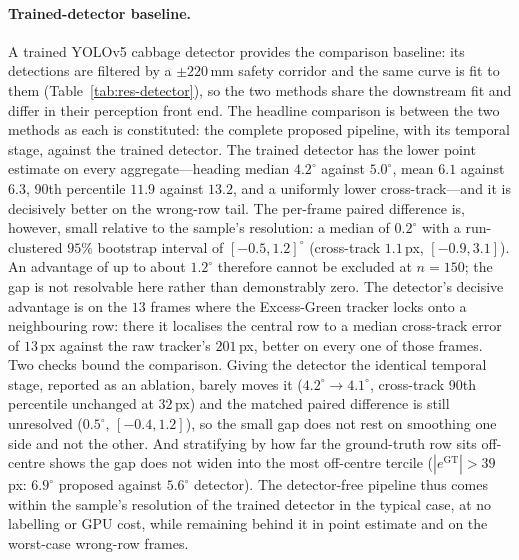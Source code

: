 \paragraph{Trained-detector baseline.}
A trained YOLOv5 cabbage detector provides the comparison baseline: its detections are filtered by a
$\pm220$\,mm safety corridor and the same curve is fit to them (Table~\ref{tab:res-detector}), so the two
methods share the downstream fit and differ in their perception front end. The headline comparison is between
the two methods as each is constituted: the complete proposed pipeline, with its temporal stage, against the
trained detector. The trained detector has the lower point estimate on every aggregate---heading median $4.2^\circ$ against
$5.0^\circ$, mean $6.1$ against $6.3$, 90th percentile $11.9$ against $13.2$, and a uniformly lower
cross-track---and it is decisively better on the wrong-row tail. The per-frame paired difference is, however,
small relative to the sample's resolution: a median of $0.2^\circ$ with a run-clustered $95\%$ bootstrap
interval of $[-0.5, 1.2]^\circ$ (cross-track $1.1$\,px, $[-0.9, 3.1]$). An advantage of up to about
$1.2^\circ$ therefore cannot be excluded at $n=150$; the gap is not resolvable here rather than demonstrably
zero. The detector's decisive advantage is on the $13$ frames where the Excess-Green tracker locks onto a
neighbouring row: there it localises the central row to a median cross-track error of $13$\,px against the
raw tracker's $201$\,px, better on every one of those frames. Two checks bound the comparison. Giving the
detector the identical temporal stage, reported as an ablation, barely moves it ($4.2^\circ\!\to\!4.1^\circ$,
cross-track 90th percentile unchanged at $32$\,px) and the matched paired difference is still unresolved
($0.5^\circ$, $[-0.4, 1.2]$), so the small gap does not rest on smoothing one side and not the other. And
stratifying by how far the ground-truth row sits off-centre shows the gap does not widen into the most
off-centre tercile ($|e^{\mathrm{GT}}|>39$\,px: $6.9^\circ$ proposed against $5.6^\circ$ detector). The
detector-free pipeline thus comes within the sample's resolution of the trained detector in the typical case,
at no labelling or GPU cost, while remaining behind it in point estimate and on the worst-case wrong-row
frames.

